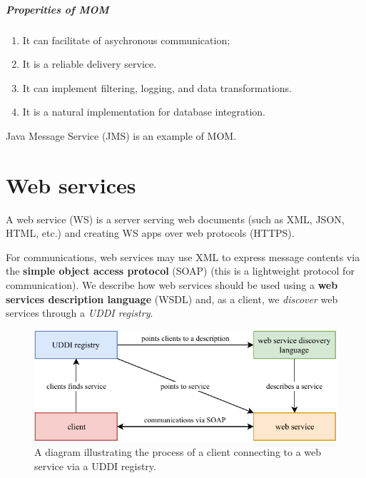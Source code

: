 \paragraph{Properities of MOM}
\begin{enumerate}
    \item It can facilitate of asychronous communication;
    \item It is a reliable delivery service.
    \item It can implement filtering, logging, and data transformations.
    \item It is a natural implementation for database integration.
\end{enumerate}

\begin{example}
    Java Message Service (JMS) is an example of  MOM.
\end{example}

\chapter{Web services}

\begin{definition}
    A web service (WS) is a server serving web documents
    (such as XML, JSON, HTML, etc.)
    and creating WS apps over web protocols (HTTPS).
\end{definition}

For communications, web services may use XML to express message
contents via the \textbf{simple object access protocol} (SOAP)
(this is a lightweight protocol for communication).
We describe how web services should be used using a 
\textbf{web services description language} (WSDL) and, as a client,
we \emph{discover} web services through a \emph{UDDI registry}.

\begin{figure}[]
    \centering
    \includegraphics[width=0.8\linewidth]{images/web-services.pdf}
    \caption{
        A diagram illustrating the process of a client connecting
        to a web service via a UDDI registry.
    }
    \label{fig:web-services}
\end{figure}

